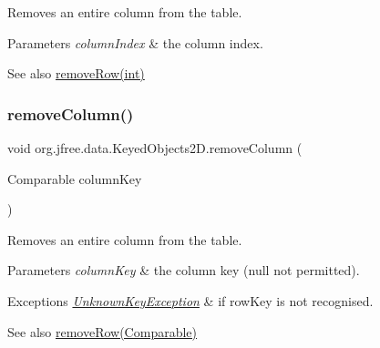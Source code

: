 Removes an entire column from the table.


\begin{DoxyParams}{Parameters}
{\em column\+Index} & the column index.\\
\hline
\end{DoxyParams}
\begin{DoxySeeAlso}{See also}
\mbox{\hyperlink{classorg_1_1jfree_1_1data_1_1_keyed_objects2_d_a402d4db2a4f3d6b95654e80e8c374bb3}{remove\+Row(int)}} 
\end{DoxySeeAlso}
\mbox{\label{classorg_1_1jfree_1_1data_1_1_keyed_objects2_d_a488bbadbf49f3b5b35d6cc6add250f68}} 
\subsubsection{\texorpdfstring{remove\+Column()}{removeColumn()}\hspace{0.1cm}{\footnotesize\ttfamily [2/2]}}
{\footnotesize\ttfamily void org.\+jfree.\+data.\+Keyed\+Objects2\+D.\+remove\+Column (\begin{DoxyParamCaption}\item[{Comparable}]{column\+Key }\end{DoxyParamCaption})}

Removes an entire column from the table.


\begin{DoxyParams}{Parameters}
{\em column\+Key} & the column key ({\ttfamily null} not permitted).\\
\hline
\end{DoxyParams}

\begin{DoxyExceptions}{Exceptions}
{\em \mbox{\hyperlink{classorg_1_1jfree_1_1data_1_1_unknown_key_exception}{Unknown\+Key\+Exception}}} & if {\ttfamily row\+Key} is not recognised.\\
\hline
\end{DoxyExceptions}
\begin{DoxySeeAlso}{See also}
\mbox{\hyperlink{classorg_1_1jfree_1_1data_1_1_keyed_objects2_d_a98a8ebeb70498799f225190f73e18fa0}{remove\+Row(\+Comparable)}} 
\end{DoxySeeAlso}
\mbox{\label{classorg_1_1jfree_1_1data_1_1_keyed_objects2_d_ac2c8e82dee1c5b5a2c9b89d4747264fd}} 
